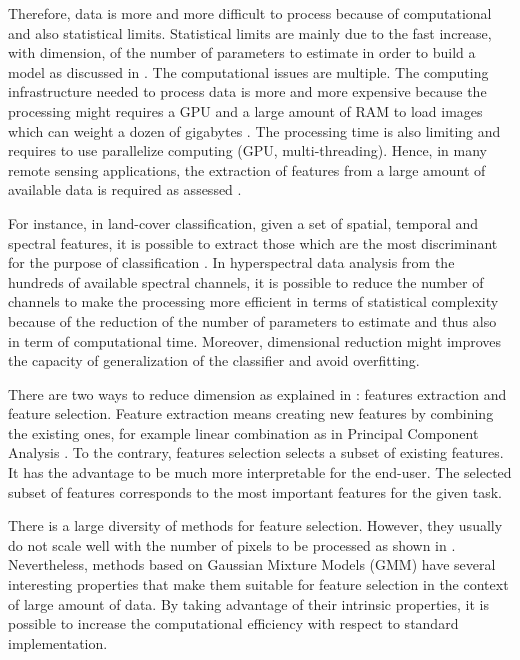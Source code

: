 \documentclass[a4paper,11pt,DIV=16,abstracton]{scrartcl}
\begin{document}
Therefore, data is more and more difficult to process because of computational and also statistical limits. Statistical limits are mainly due to the fast increase, with dimension, of the number of parameters to estimate in order to build a model as discussed in \cite{bouveyron2014model}. The computational issues are multiple. The computing infrastructure needed to process data is more and more expensive because the processing might requires a GPU and a large amount of RAM to load images which can weight a dozen of gigabytes \cite{christophe2011remote}\cite{plaza2011high}. The processing time is also limiting and requires to use parallelize computing (GPU, multi-threading). Hence, in many remote sensing applications, the extraction of features from a large amount of available data is required as assessed \cite{jimenez1998supervised}.

For instance, in land-cover classification, given a set of spatial, temporal and spectral features, it is possible to extract those which are the most discriminant for the purpose of classification \cite{fassnacht2014comparison}. In hyperspectral data analysis from the hundreds of available spectral channels, it is possible to reduce the number of channels to make the processing more efficient in terms of statistical complexity because of the reduction of the number of parameters to estimate and thus also in term of computational time. Moreover, dimensional reduction might improves the capacity of generalization of the classifier and avoid overfitting.

There are two ways to reduce dimension as explained in \cite{Guyon:2006:FEF:1208773}: features extraction and feature selection. Feature extraction means creating new features by combining the existing ones, for example linear combination as in Principal Component Analysis \cite{jimenez1998supervised}. To the contrary, features selection selects a subset of existing features. It has the advantage to be much more interpretable for the end-user. The selected subset of features corresponds to the most important features for the given task.

There is a large diversity of methods for feature selection. However, they usually do not scale well with the number of pixels to be processed as shown in \cite{fauvel2015fast}. Nevertheless, methods based on Gaussian Mixture Models (GMM) have several interesting properties that make them suitable for feature selection in the context of large amount of data. By taking advantage of their intrinsic properties, it is possible to increase the computational efficiency with respect to standard implementation.
\end{document}
